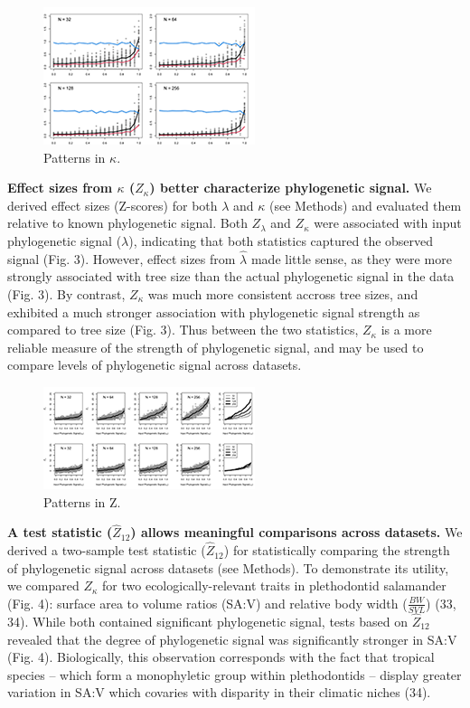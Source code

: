\documentclass[9pt,twocolumn,twoside,lineno]{pnas-new}
\begin{document}
\begin{figure}
\centering
\includegraphics{new.fig.2.temp.png}
\caption{Patterns in \(\kappa\).{}}
\end{figure}

\textbf{Effect sizes from \(\kappa\) (\(Z_{\kappa}\)) better
characterize phylogenetic signal.} We derived effect sizes (Z-scores)
for both \(\lambda\) and \(\kappa\) (see Methods) and evaluated them
relative to known phylogenetic signal. Both \(Z_{\lambda}\) and
\(Z_{\kappa}\) were associated with input phylogenetic signal
(\(\lambda\)), indicating that both statistics captured the observed
signal (Fig. 3). However, effect sizes from \(\hat{\lambda}\) made
little sense, as they were more strongly associated with tree size than
the actual phylogenetic signal in the data (Fig. 3). By contrast,
\(Z_{\kappa}\) was much more consistent accross tree sizes, and
exhibited a much stronger association with phylogenetic signal strength
as compared to tree size (Fig. 3). Thus between the two statistics,
\(Z_{\kappa}\) is a more reliable measure of the strength of
phylogenetic signal, and may be used to compare levels of phylogenetic
signal across datasets.

\begin{figure}
\centering
\includegraphics{new.fig.3.temp.png}
\caption{Patterns in Z.{}}
\end{figure}

\textbf{A test statistic (\(\hat{Z}_{12}\)) allows meaningful
comparisons across datasets.} We derived a two-sample test statistic
(\(\hat{Z}_{12}\)) for statistically comparing the strength of
phylogenetic signal across datasets (see Methods). To demonstrate its
utility, we compared \(Z_{\kappa}\) for two ecologically-relevant traits
in plethodontid salamander (Fig. 4): surface area to volume ratios
(SA:V) and relative body width (\(\frac{BW}{SVL}\)) (33, 34). While both
contained significant phylogenetic signal, tests based on
\(\hat{Z}_{12}\) revealed that the degree of phylogenetic signal was
significantly stronger in SA:V (Fig. 4). Biologically, this observation
corresponds with the fact that tropical species -- which form a
monophyletic group within plethodontids -- display greater variation in
SA:V which covaries with disparity in their climatic niches (34).
\end{document}
